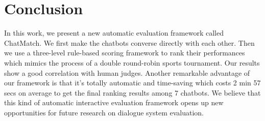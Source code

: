 \section{Conclusion}
\label{sec:conclude}
In this work, we present a new automatic evaluation framework called ChatMatch. 
We first make the chatbots converse directly with each other. 
Then we use a three-level rule-based scoring framework to rank their performances which mimics the process of a double round-robin sports tournament. 
Our results show a good correlation with human judges. Another remarkable advantage of our framework is that it's totally automatic and time-saving which costs 2 min 57 secs on average to get the final ranking results among 7 chatbots. 
We believe that this kind of automatic interactive evaluation framework opens up new opportunities for future research on 
dialogue system evaluation.
